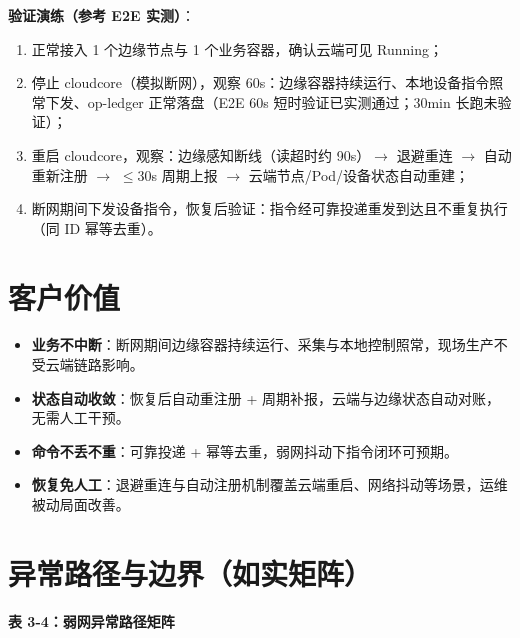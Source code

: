 \textbf{验证演练（参考 E2E 实测）}：

\begin{enumerate}
  \item 正常接入 1 个边缘节点与 1 个业务容器，确认云端可见 Running；
  \item 停止 cloudcore（模拟断网），观察 60s：边缘容器持续运行、本地设备指令照常下发、op-ledger 正常落盘（E2E 60s 短时验证已实测通过；30min 长跑未验证）；
  \item 重启 cloudcore，观察：边缘感知断线（读超时约 90s）$\rightarrow$ 退避重连 $\rightarrow$ 自动重新注册 $\rightarrow$ $\le$30s 周期上报 $\rightarrow$ 云端节点/Pod/设备状态自动重建；
  \item 断网期间下发设备指令，恢复后验证：指令经可靠投递重发到达且不重复执行（同 ID 幂等去重）。
\end{enumerate}

\section{客户价值}

\begin{itemize}
  \item \textbf{业务不中断}：断网期间边缘容器持续运行、采集与本地控制照常，现场生产不受云端链路影响。
  \item \textbf{状态自动收敛}：恢复后自动重注册 + 周期补报，云端与边缘状态自动对账，无需人工干预。
  \item \textbf{命令不丢不重}：可靠投递 + 幂等去重，弱网抖动下指令闭环可预期。
  \item \textbf{恢复免人工}：退避重连与自动注册机制覆盖云端重启、网络抖动等场景，运维被动局面改善。
\end{itemize}

\section{异常路径与边界（如实矩阵）}

\textbf{表 3-4：弱网异常路径矩阵}

